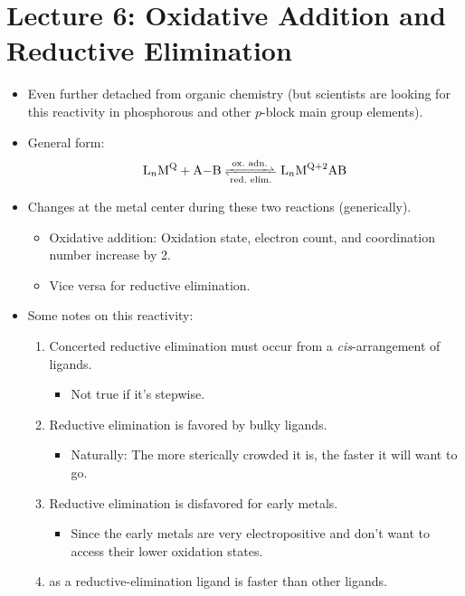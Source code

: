 \documentclass[../notes.tex]{subfiles}
\begin{document}
\section{Lecture 6: Oxidative Addition and Reductive Elimination}
\begin{itemize}
    \item {}Even further detached from organic chemistry (but scientists are looking for this reactivity in phosphorous and other $p$-block main group elements).
    \item General form:
    \begin{equation*}
        \ce{L_nM^Q + A-B <=>[{ox. adn.}][{red. elim.}] L_nM^{Q+2}AB}
    \end{equation*}
    \item Changes at the metal center during these two reactions (generically).
    \begin{itemize}
        \item Oxidative addition: Oxidation state, electron count, and coordination number increase by 2.
        \item Vice versa for reductive elimination.
    \end{itemize}
    \item Some notes on this reactivity:
    \begin{enumerate}
        \item Concerted reductive elimination must occur from a \emph{cis}-arrangement of ligands.
        \begin{itemize}
            \item Not true if it's stepwise.
        \end{itemize}
        \item Reductive elimination is favored by bulky ligands.
        \begin{itemize}
            \item Naturally: The more sterically crowded it is, the faster it will want to go.
        \end{itemize}
        \item Reductive elimination is disfavored for early metals.
        \begin{itemize}
            \item Since the early metals are very electropositive and don't want to access their lower oxidation states.
        \end{itemize}
        \item {} as a reductive-elimination ligand is faster than other ligands.

\end{enumerate}
\end{itemize}
\end{document}
